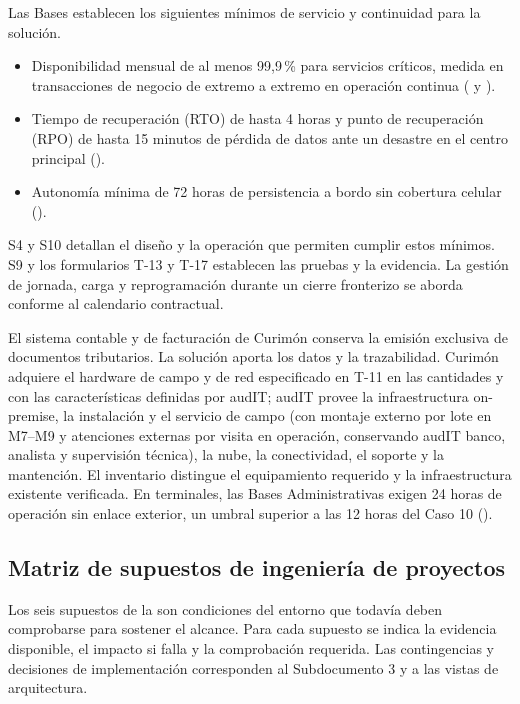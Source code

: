 Las Bases establecen los siguientes mínimos de servicio y continuidad para la solución.

\begin{itemize}
  \item Disponibilidad mensual de al menos 99,9\,\% para servicios críticos, medida en transacciones de negocio de extremo a extremo en operación continua ( y ).
  \item Tiempo de recuperación (RTO) de hasta 4 horas y punto de recuperación (RPO) de hasta 15 minutos de pérdida de datos ante un desastre en el centro principal ().
  \item Autonomía mínima de 72 horas de persistencia a bordo sin cobertura celular ().
\end{itemize}

S4 y S10 detallan el diseño y la operación que permiten cumplir estos mínimos. S9 y los formularios T-13 y T-17 establecen las pruebas y la evidencia. La gestión de jornada, carga y reprogramación durante un cierre fronterizo se aborda conforme al calendario contractual.

El sistema contable y de facturación de Curimón conserva la emisión exclusiva de documentos tributarios. La solución aporta los datos y la trazabilidad. Curimón adquiere el hardware de campo y de red especificado en T-11 en las cantidades y con las características definidas por audIT; audIT provee la infraestructura on-premise, la instalación y el servicio de campo (con montaje externo por lote en M7--M9 y atenciones externas por visita en operación, conservando audIT banco, analista y supervisión técnica), la nube, la conectividad, el soporte y la mantención. El inventario distingue el equipamiento requerido y la infraestructura existente verificada. En terminales, las Bases Administrativas exigen 24 horas de operación sin enlace exterior, un umbral superior a las 12 horas del Caso 10 ().

\subsection{Matriz de supuestos de ingeniería de proyectos}\label{sec:2-supuestos-matriz}

Los seis supuestos de la  son condiciones del entorno que todavía deben comprobarse para sostener el alcance. Para cada supuesto se indica la evidencia disponible, el impacto si falla y la comprobación requerida. Las contingencias y decisiones de implementación corresponden al Subdocumento 3 y a las vistas de arquitectura.

